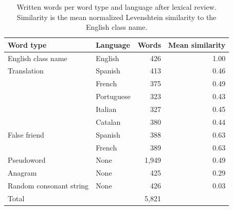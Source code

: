 \begin{table}[tbp]
\centering
\caption{Written words per word type and language after lexical review. Similarity is the mean normalized Levenshtein similarity to the English class name.}
\label{tab:stimuli}
\small
\begin{tabular*}{\textwidth}{@{\extracolsep{\fill}}llrr@{}}
\toprule
Word type & Language & Words & Mean similarity \\
\midrule
English class name & English & 426 & 1.00 \\
Translation & Spanish & 413 & 0.46 \\
 & French & 375 & 0.49 \\
 & Portuguese & 323 & 0.43 \\
 & Italian & 327 & 0.45 \\
 & Catalan & 380 & 0.44 \\
False friend & Spanish & 388 & 0.63 \\
 & French & 389 & 0.63 \\
Pseudoword & None & 1{,}949 & 0.49 \\
Anagram & None & 425 & 0.29 \\
Random consonant string & None & 426 & 0.03 \\
\midrule
Total & & 5{,}821 & \\
\bottomrule
\end{tabular*}
\end{table}
